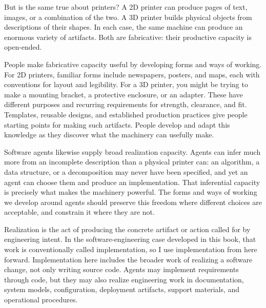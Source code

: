 But is the same true about printers? A 2D printer can produce pages of text, images, or a combination of the two. A 3D printer builds physical objects from descriptions of their shapes. In each case, the same machine can produce an enormous variety of artifacts. Both are fabricative: their productive capacity is open-ended.


People make fabricative capacity useful by developing forms and ways of working. For 2D printers, familiar forms include newspapers, posters, and maps, each with conventions for layout and legibility. For a 3D printer, you might be trying to make a mounting bracket, a protective enclosure, or an adapter. These have different purposes and recurring requirements for strength, clearance, and fit. Templates, reusable designs, and established production practices give people starting points for making such artifacts. People develop and adapt this knowledge as they discover what the machinery can usefully make.


Software agents likewise supply broad realization capacity. Agents can infer much more from an incomplete description than a physical printer can: an algorithm, a data structure, or a decomposition may never have been specified, and yet an agent can choose them and produce an implementation. That inferential capacity is precisely what makes the machinery powerful. The forms and ways of working we develop around agents should preserve this freedom where different choices are acceptable, and constrain it where they are not.

Realization is the act of producing the concrete artifact or action called for by engineering intent. In the software-engineering case developed in this book, that work is conventionally called implementation, so I use implementation from here forward. Implementation here includes the broader work of realizing a software change, not only writing source code. Agents may implement requirements through code, but they may also realize engineering work in documentation, system models, configuration, deployment artifacts, support materials, and operational procedures.

